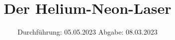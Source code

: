

\subject{v61}
\title{Der Helium-Neon-Laser}
\date{%
  Durchführung: 05.05.2023
  \hspace{3em}
  Abgabe: 08.03.2023
}



\maketitle
\thispagestyle{empty}
\tableofcontents
\newpage






\printbibliography{}


